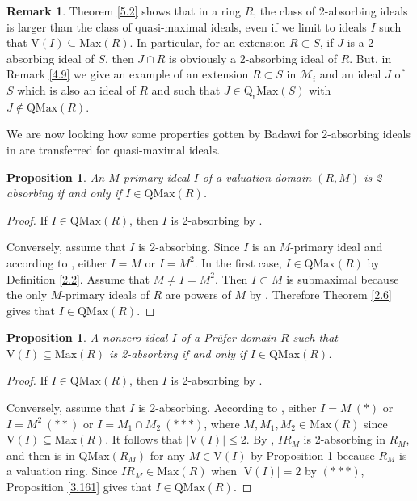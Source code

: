 \documentclass[12pt,leqno]{amsart}
\newtheorem{proposition}[theorem]{Proposition}
\theoremstyle{definition}
\newtheorem{remark}[theorem]{Remark}
\begin{document}
\begin{remark}\label{5.14} 
Theorem \ref{5.2} shows that in a ring $R$, the class of 2-absorbing ideals is larger than the class of quasi-maximal ideals, even if we limit to ideals $I$ such that $\mathrm{V}(I)\subseteq\mathrm{Max}(R)$. In particular, for an extension $R\subset S$, if $J$ is a 2-absorbing ideal of $S$, then $J\cap R$ is obviously a 2-absorbing ideal of $R$.  But, in Remark \ref{4.9} we give an example of an extension $R\subset S$ in $\mathcal M_i$ and an ideal $J$ of $S$ which is also an ideal of $R$ and such that $J\in\mathrm{Q_rMax}(S)$ with $J\not\in\mathrm {QMax}(R)$.
\end{remark}

We are now looking how some properties gotten by Badawi for 2-absorbing ideals in \cite{Ba} are transferred  for quasi-maximal ideals.

\begin{proposition}\label{5.8} An $M$-primary ideal $I$ of a valuation domain $(R,M)$ is 2-absorbing if and only if $I\in\mathrm{QMax}(R)$.
\end{proposition}

\begin{proof} If $I\in\mathrm{QMax}(R)$, then $I$ is 2-absorbing by \cite[Theorem 1]{AKKT}. 

Conversely, assume that $I$ is 2-absorbing. Since $I$ is an $M$-primary ideal and according to \cite[Proposition 3.10]{Ba}, either $I=M$ or $I=M^2 $. In the first case, $I\in\mathrm{QMax}(R)$ by Definition \ref{2.2}. Assume that $M\neq I=M^2$. Then $I\subset M$ is submaximal because the only $ M$-primary ideals of $R$ are powers of $M$ by \cite[Theorem 5.11]{LM}. Therefore Theorem \ref{2.6} gives that $I\in\mathrm{QMax}(R)$.
\end{proof} 

\begin{proposition}\label{5.9} A nonzero ideal $I$ of a Pr\"ufer domain $R$ such that $\mathrm{V}(I)\subseteq\mathrm{Max}(R)$
 is 2-absorbing if and only if $I\in\mathrm{QMax}(R)$.
\end{proposition}

\begin{proof} If $I\in\mathrm{QMax}(R)$, then $I$ is 2-absorbing by \cite[Theorem 1]{AKKT}. 

Conversely, assume that $I$ is 2-absorbing. According to \cite[Theorem 3.14]{Ba}, either $I=M\ (*)$ or $I=M^2\ (**)$ or $I=M_1\cap M_2\ (***)$,  where $M,M_1,M_2\in\mathrm{Max}(R)$ since $\mathrm{V}(I)\subseteq\mathrm{Max}(R)$. It follows that $|\mathrm{V}(I)|\leq 2$. By \cite[Lemma 3.13]{Ba}, $IR_M$ is 2-absorbing in $R_M$, and then is in $\mathrm {QMax}(R_M)$ for any $M\in\mathrm{V}(I)$ by Proposition \ref{5.8} because $R_M$ is a valuation ring. Since $IR_M\in\mathrm{Max}(R)$ when $|\mathrm{V}(I)|=2$ by $(***)$,  Proposition \ref{3.161} gives that $I\in\mathrm{QMax}(R)$.
\end{proof} 
\end{document}

